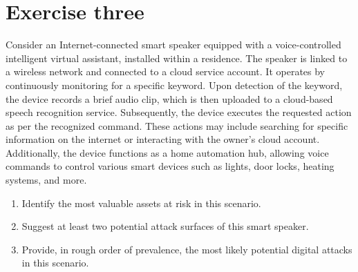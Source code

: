 \section{Exercise three}

Consider an Internet-connected smart speaker equipped with a voice-controlled intelligent virtual assistant, installed within a residence.
The speaker is linked to a wireless network and connected to a cloud service account.
It operates by continuously monitoring for a specific keyword. 
Upon detection of the keyword, the device records a brief audio clip, which is then uploaded to a cloud-based speech recognition service.
Subsequently, the device executes the requested action as per the recognized command.
These actions may include searching for specific information on the internet or interacting with the owner's cloud account.
Additionally, the device functions as a home automation hub, allowing voice commands to control various smart devices such as lights, door locks, heating systems, and more.
\begin{enumerate}
    \item Identify the most valuable assets at risk in this scenario.
    \item Suggest at least two potential attack surfaces of this smart speaker.
    \item Provide, in rough order of prevalence, the most likely potential digital attacks in this scenario.
\end{enumerate}

